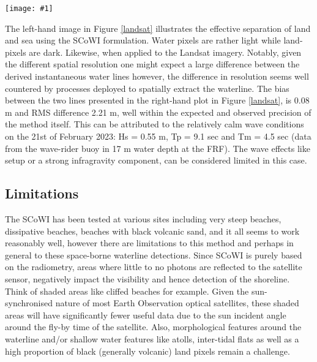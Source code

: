 \documentclass[remotesensing,article,submit,pdftex,moreauthors]{Definitions/mdpi}
\newcommand{\myfigure}[4]{
    \begin{figure*}[ht!]
        \centering
        \texttt{[image: \#1]}	 
        \caption{\itshape#2}
        \label{#3}
    \end{figure*} 
}
\begin{document}
\myfigure{img/duck_comparison_20230221_2.png}{SCoWI applied to Sentinel-2 and LandSat satellite optical imagery at Duck (USA). The left-hand image shows the SCoWI applied to a Sentinel-2 image (21 February 2023 at 15h50 GMT) and the middle image to Landsat-8 image (21 February 2023 at 15h41 GMT). The grey-scale limits are set between 2\% to 98\% of all pixel values for both images. The coloured lines represent the detected instantaneous water line, which are then both superimposed onto a Sentinel-2 image on the right-hand side.}{landsat}{1}

The left-hand image in Figure \ref{landsat} illustrates the effective separation of land and sea using the SCoWI formulation. Water pixels are rather light while land-pixels are dark. Likewise, when applied to the Landsat imagery. Notably, given the different spatial resolution one might expect a large difference between the derived instantaneous water lines however, the difference in resolution seems well countered by processes deployed to spatially extract the waterline.  The bias between the two lines presented in the right-hand plot in Figure \ref{landsat}, is 0.08 m and RMS difference 2.21 m, well within the expected and observed precision of the method itself. This can be attributed to the relatively calm wave conditions on the 21st of February 2023: Hs = 0.55 m, Tp = 9.1 sec and Tm = 4.5 sec (data from the wave-rider buoy in 17 m water depth at the FRF). The wave effects like setup or a strong infragravity component, can be considered limited in this case.

\subsection{Limitations}
The SCoWI has been tested at various sites including very steep beaches, dissipative beaches, beaches with black volcanic sand, and it all seems to work reasonably well, however there are limitations to this method and perhaps in general to these space-borne waterline detections. Since SCoWI is purely based on the radiometry, areas where little to no photons are reflected to the satellite sensor, negatively impact the visibility and hence detection of the shoreline. Think of shaded areas like cliffed beaches for example. Given the sun-synchronised nature of most Earth Observation optical satellites, these shaded areas will have significantly fewer useful data due to the sun incident angle around the fly-by time of the satellite. Also, morphological features around the waterline and/or shallow water features like atolls, inter-tidal flats as well as a high proportion of black (generally volcanic) land pixels remain a challenge.
\end{document}
